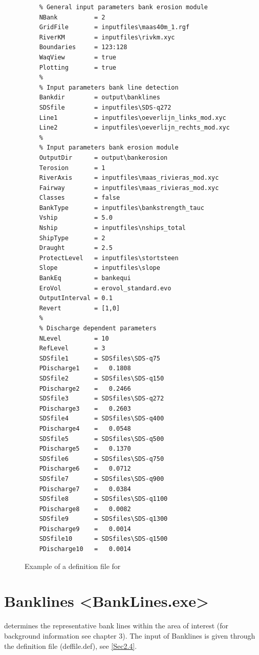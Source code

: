 \begin{figure}
\begin{verbatim}
    % General input parameters bank erosion module
    NBank          = 2
    GridFile       = inputfiles\maas40m_1.rgf
    RiverKM        = inputfiles\rivkm.xyc
    Boundaries     = 123:128
    WaqView        = true
    Plotting       = true
    %
    % Input parameters bank line detection
    Bankdir        = output\banklines
    SDSfile        = inputfiles\SDS-q272
    Line1          = inputfiles\oeverlijn_links_mod.xyc
    Line2          = inputfiles\oeverlijn_rechts_mod.xyc
    %
    % Input parameters bank erosion module
    OutputDir      = output\bankerosion
    Terosion       = 1
    RiverAxis      = inputfiles\maas_rivieras_mod.xyc
    Fairway        = inputfiles\maas_rivieras_mod.xyc
    Classes        = false
    BankType       = inputfiles\bankstrength_tauc
    Vship          = 5.0
    Nship          = inputfiles\nships_total
    ShipType       = 2
    Draught        = 2.5
    ProtectLevel   = inputfiles\stortsteen
    Slope          = inputfiles\slope
    BankEq         = bankequi
    EroVol         = erovol_standard.evo
    OutputInterval = 0.1
    Revert         = [1,0]
    %
    % Discharge dependent parameters
    NLevel         = 10
    RefLevel       = 3
    SDSfile1       = SDSfiles\SDS-q75
    PDischarge1    =   0.1808
    SDSfile2       = SDSfiles\SDS-q150
    PDischarge2    =   0.2466
    SDSfile3       = SDSfiles\SDS-q272
    PDischarge3    =   0.2603
    SDSfile4       = SDSfiles\SDS-q400
    PDischarge4    =   0.0548
    SDSfile5       = SDSfiles\SDS-q500
    PDischarge5    =   0.1370
    SDSfile6       = SDSfiles\SDS-q750
    PDischarge6    =   0.0712
    SDSfile7       = SDSfiles\SDS-q900
    PDischarge7    =   0.0384
    SDSfile8       = SDSfiles\SDS-q1100
    PDischarge8    =   0.0082
    SDSfile9       = SDSfiles\SDS-q1300
    PDischarge9    =   0.0014
    SDSfile10      = SDSfiles\SDS-q1500
    PDischarge10   =   0.0014
\end{verbatim}
\caption{Example of a definition file for \dfastbe}
\label{Fig2.1}
\end{figure}

\section{Banklines <BankLines.exe>}

determines the representative bank lines within the area of interest (for background information see chapter 3).
The input of Banklines is given through the definition file (deffile.def), see \autoref{Sec2.4}.

